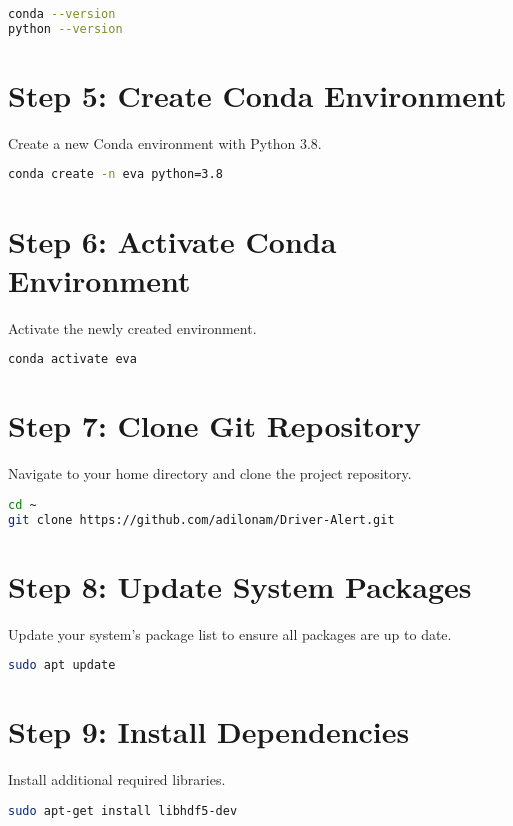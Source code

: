 \documentclass{report}
\begin{document}
\begin{lstlisting}[language=bash]
conda --version
python --version
\end{lstlisting}

\section{Step 5: Create Conda Environment}
Create a new Conda environment with Python 3.8.

\begin{lstlisting}[language=bash]
conda create -n eva python=3.8
\end{lstlisting}

\section{Step 6: Activate Conda Environment}
Activate the newly created environment.

\begin{lstlisting}[language=bash]
conda activate eva
\end{lstlisting}

\section{Step 7: Clone Git Repository}
Navigate to your home directory and clone the project repository.

\begin{lstlisting}[language=bash]
cd ~
git clone https://github.com/adilonam/Driver-Alert.git
\end{lstlisting}

\section{Step 8: Update System Packages}
Update your system's package list to ensure all packages are up to date.

\begin{lstlisting}[language=bash]
sudo apt update
\end{lstlisting}

\section{Step 9: Install Dependencies}
Install additional required libraries.

\begin{lstlisting}[language=bash]
sudo apt-get install libhdf5-dev
\end{lstlisting}
\end{document}
